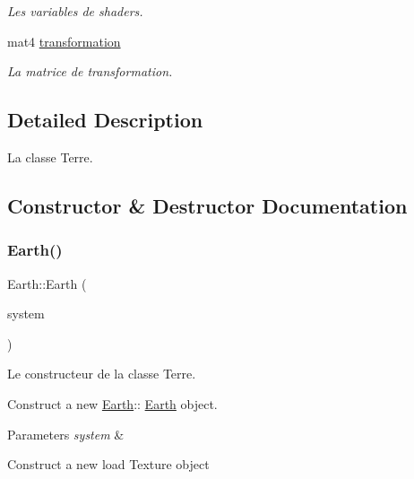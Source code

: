 \begin{DoxyCompactItemize}
\begin{tabbing}
\end{tabbing}\begin{DoxyCompactList}\small\item\em Les variables de shaders. \end{DoxyCompactList}\item 
\mbox{\label{classEarth_a42d113c06d114577906dc9d615e6fc7f}} 
mat4 \mbox{\hyperlink{classEarth_a42d113c06d114577906dc9d615e6fc7f}{transformation}}
\begin{DoxyCompactList}\small\item\em La matrice de transformation. \end{DoxyCompactList}\end{DoxyCompactItemize}


\subsection{Detailed Description}
La classe Terre. 



\subsection{Constructor \& Destructor Documentation}
\mbox{\label{classEarth_ac63bc8757dd60da6a19555690e3a1cd4}} 
\subsubsection{\texorpdfstring{Earth()}{Earth()}}
{\footnotesize\ttfamily Earth\+::\+Earth (\begin{DoxyParamCaption}\item[{\mbox{\hyperlink{classSolarSystem}{Solar\+System}} $\ast$}]{system }\end{DoxyParamCaption})}



Le constructeur de la classe Terre. 

Construct a new \mbox{\hyperlink{classEarth}{Earth}}\+:\+: \mbox{\hyperlink{classEarth}{Earth}} object.


\begin{DoxyParams}{Parameters}
{\em system} & \\
\hline
\end{DoxyParams}
Construct a new load Texture object \mbox{\label{classEarth_ac215e2016eccb7a4764ad40048f78b74}} 
